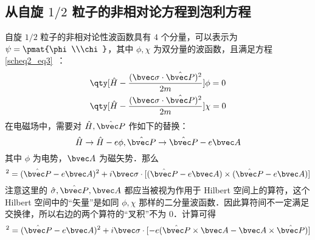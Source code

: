 
\subsection{从自旋 $1/2$ 粒子的非相对论方程到泡利方程}
自旋 $1/2$ 粒子的非相对论性波函数具有 $4$ 个分量，可以表示为 $\psi=\pmat{\phi\\\chi}$，其中 $\phi,\chi$ 为双分量的波函数，且满足方程\autoref{scheq2_eq3}~：
\begin{equation}
\begin{aligned}
&\qty[\hat H-\frac{(\bvec \sigma\cdot \hat{\bvec P})^2}{2m}]\phi=0\\
&
\qty[\hat H-\frac{(\bvec \sigma\cdot \hat{\bvec P})^2}{2m}]\chi=0
\end{aligned}
\end{equation}
在电磁场中，需要对 $\hat H,\hat{\bvec P}$ 作如下的替换：
\begin{equation}
\hat H\rightarrow \hat H-e\phi, \hat{\bvec P}\rightarrow \hat{\bvec P}-e\bvec A
\end{equation}
其中 $\phi$ 为电势，$\bvec A$ 为磁矢势．那么
\begin{equation}
[\bvec \sigma\cdot(\hat{\bvec P}-e\bvec A)]^2=(\hat{\bvec P}-e\bvec A)^2+i\bvec \sigma\cdot[(\hat{\bvec P}-e\bvec A)\times (\hat{\bvec P}-e\bvec A)]
\end{equation}
注意这里的 $\hat \sigma,\hat{\bvec P},\bvec A$ 都应当被视为作用于 Hilbert 空间上的算符，这个 Hilbert 空间中的“矢量”是如同 $\phi,\chi$ 那样的二分量波函数．因此算符间不一定满足交换律，所以右边的两个算符的“叉积”不为 $0$．计算可得
\begin{equation}
[\bvec \sigma\cdot(\hat{\bvec P}-e\bvec A)]^2=(\hat{\bvec P}-e\bvec A)^2+i\bvec \sigma\cdot[-e(\hat{\bvec P}\times \bvec A- \bvec A\times \hat{\bvec P})]
\end{equation}
